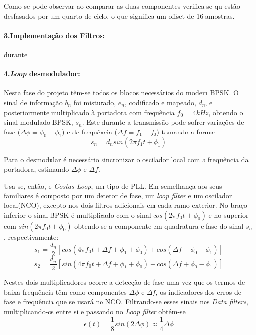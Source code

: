 \documentclass[11pt]{article}
\numberwithin{equation}{section}
\begin{document}
Como se pode observar ao comparar as duas componentes verifica-se qu estão desfasados por um quarto de ciclo, o que significa um offset de 16 amostras.
\paragraph{3.Implementação dos Filtros:} \hspace{0pt}   \label{para:P3-3}       durante

\paragraph{4.\textit{Loop} desmodulador:} \hspace{0pt}
   \label{para:P3-4}

Nesta fase do projeto têm-se todos os blocos necessários do modem BPSK. O sinal de informação $b_n$ foi misturado, $e_n$, codificado e mapeado, $d_n$, e posteriormente multiplicado à portadora com frequência $f_0 = 4kHz$, obtendo o sinal modulado BPSK, $s_n$. Este durante a transmissão pode sofrer variações de fase ($\Delta\phi=\phi_0-\phi_1$) e de frequência ($\Delta f = f_1-f_0$) tomando a forma:
\begin{equation}
	s_n=d_nsin(2\pi f_1t+ \phi_1)
\end{equation}

 Para o desmodular é necessário sincronizar o oscilador local com a frequência da portadora, estimando $\Delta\phi$ e $\Delta f$.

Usa-se, então, o \textit{Costas Loop}, um tipo de PLL. Em semelhança aos seus familiares é composto por um detetor de fase, um \textit{loop filter} e um oscilador local(NCO), excepto nos dois filtros adicionais em cada ramo exterior. No braço inferior o sinal BPSK é multiplicado com o sinal $cos(2\pi f_0t+\phi_0)$ e no superior com $sin(2\pi f_0t+ \phi_0)$ obtendo-se a componente em quadratura e fase do sinal $s_n$, respectivamente: 
\begin{equation}
s_1=\frac{d_n}{2}[cos(4\pi f_0t+\Delta f+\phi_1+\phi_0)+cos(\Delta f+\phi_0-\phi_1)]
\end{equation}
\begin{equation}
s_2=\frac{d_n}{2}[sin(4\pi f_0t+\Delta f+\phi_1+\phi_0)+cos(\Delta f+\phi_0-\phi_1)]
\end{equation} 

Nestes dois multiplicadores ocorre a detecção de fase uma vez que os termos de baixa frequência têm como componentes $\Delta\phi$ e $\Delta f$, os indicadores dos erros de fase e frequência que se usará no NCO. Filtrando-se esses sinais nos \textit{Data filters}, multiplicando-os entre si e passando no \textit{Loop filter} obtém-se 
\begin{equation}
\epsilon(t)=\frac{1}{8}sin(2\Delta\phi)\approx\frac{1}{4}\Delta\phi
\end{equation}
\end{document}
